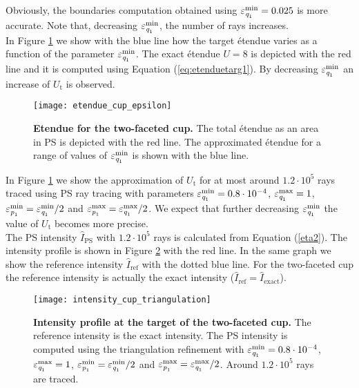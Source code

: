  Obviously, the boundaries computation obtained using $\varepsilon_{\textit{q}_1}^{\textrm{min}} = 0.025$ is more accurate. 
Note that, decreasing $\varepsilon_{\textit{q}_1}^{\textrm{min}}$, the number of rays increases. 
\\ \indent In Figure \ref{fig:etendue_cup} we show with the blue line how the target \'{e}tendue varies as a function of the parameter $\varepsilon_{\textit{q}_1}^{\textrm{min}}$. The exact \'{e}tendue $U=8$ is depicted with the red line and it is computed using Equation (\ref{eq:etenduetarg1}). By decreasing $\varepsilon_{\textit{q}_1}^{\textrm{min}}$ an increase of $U_{\textrm{t}}$ is observed. %
 \begin{figure}[t]
  \center
  \texttt{[image: etendue\_cup\_epsilon]}
  \caption{\textbf{Etendue for the two-faceted cup.} The total \'{e}tendue as an area in PS is depicted with the red line. The approximated \'{e}tendue for a range of values of 
$\varepsilon_{\textit{q}_1}^{\textrm{min}}$ is shown with the blue line.}
  \label{fig:etendue_cup}
\end{figure}
In Figure \ref{fig:etendue_cup} we show the approximation of $U_{\textrm{t}}$ for at most around $1.2 \cdot 10^5$ rays traced using PS ray tracing with parameters $\varepsilon_{\textit{q}_1}^{\textrm{min}}=0.8\cdot 10^{-4}$, $\varepsilon_{\textit{q}_1}^{\textrm{max}}=1$, $\varepsilon_{\textit{p}_1}^{\textrm{min}}=\varepsilon_{\textit{q}_1}^{\textrm{min}}/2$ and $\varepsilon_{\textit{p}_1}^{\textrm{max}}= \varepsilon_{\textit{q}_1}^{\textrm{max}}/2$. We expect that further decreasing $\varepsilon_{\textit{q}_1}^{\textrm{min}}$ the value of $U_{\textrm{t}}$ becomes more precise. 
\\ \indent The PS intensity $\hat{I}_{\textrm{PS}}$ with $1.2 \cdot 10^5$ rays is calculated from Equation (\ref{eta2}). The intensity profile is shown in Figure \ref{fig:intensity_cup_triangulation} with the red line. In the same graph we show the reference intensity $\hat{I}_{\textrm{ref}}$ with the dotted blue line. For the two-faceted cup the reference intensity is actually the exact intensity ($\hat{I}_{\textrm{ref}}= \hat{I}_{\textrm{exact}}$). 
 \begin{figure}[t]
  \center
  \texttt{[image: intensity\_cup\_triangulation]}
  \caption{\textbf{Intensity profile at the target of the two-faceted cup.} The reference intensity is the exact intensity. The PS intensity is computed using the triangulation refinement with $\varepsilon_{\textit{q}_1}^{\textrm{min}}=0.8\cdot 10^{-4}$, $\varepsilon_{\textit{q}_1}^{\textrm{max}}=1$, $\varepsilon_{\textit{p}_1}^{\textrm{min}}=\varepsilon_{\textit{q}_1}^{\textrm{min}}/2$ and $\varepsilon_{\textit{p}_1}^{\textrm{max}}= \varepsilon_{\textit{q}_1}^{\textrm{max}}/2$. Around $1.2 \cdot 10^5$ rays are traced.}
  \label{fig:intensity_cup_triangulation}
\end{figure}
